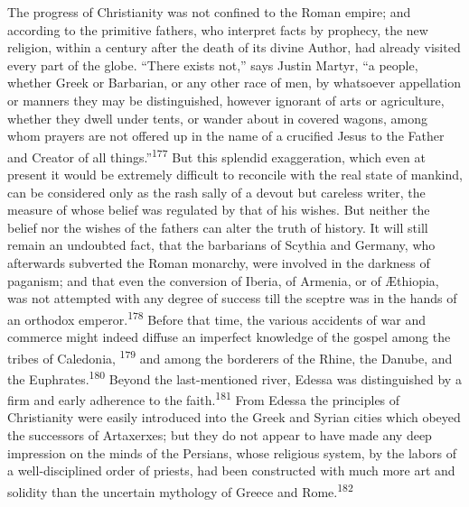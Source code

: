 The progress of Christianity was not confined to the Roman
empire; and according to the primitive fathers, who interpret
facts by prophecy, the new religion, within a century after the
death of its divine Author, had already visited every part of the
globe. “There exists not,” says Justin Martyr, “a people, whether
Greek or Barbarian, or any other race of men, by whatsoever
appellation or manners they may be distinguished, however
ignorant of arts or agriculture, whether they dwell under tents,
or wander about in covered wagons, among whom prayers are not
offered up in the name of a crucified Jesus to the Father and
Creator of all things.”\textsuperscript{177} But this splendid exaggeration, which
even at present it would be extremely difficult to reconcile with
the real state of mankind, can be considered only as the rash
sally of a devout but careless writer, the measure of whose
belief was regulated by that of his wishes. But neither the
belief nor the wishes of the fathers can alter the truth of
history. It will still remain an undoubted fact, that the
barbarians of Scythia and Germany, who afterwards subverted the
Roman monarchy, were involved in the darkness of paganism; and
that even the conversion of Iberia, of Armenia, or of Æthiopia,
was not attempted with any degree of success till the sceptre was
in the hands of an orthodox emperor.\textsuperscript{178} Before that time, the
various accidents of war and commerce might indeed diffuse an
imperfect knowledge of the gospel among the tribes of Caledonia, \textsuperscript{179}
and among the borderers of the Rhine, the Danube, and the
Euphrates.\textsuperscript{180} Beyond the last-mentioned river, Edessa was
distinguished by a firm and early adherence to the faith.\textsuperscript{181}
From Edessa the principles of Christianity were easily introduced
into the Greek and Syrian cities which obeyed the successors of
Artaxerxes; but they do not appear to have made any deep
impression on the minds of the Persians, whose religious system,
by the labors of a well-disciplined order of priests, had been
constructed with much more art and solidity than the uncertain
mythology of Greece and Rome.\textsuperscript{182}




